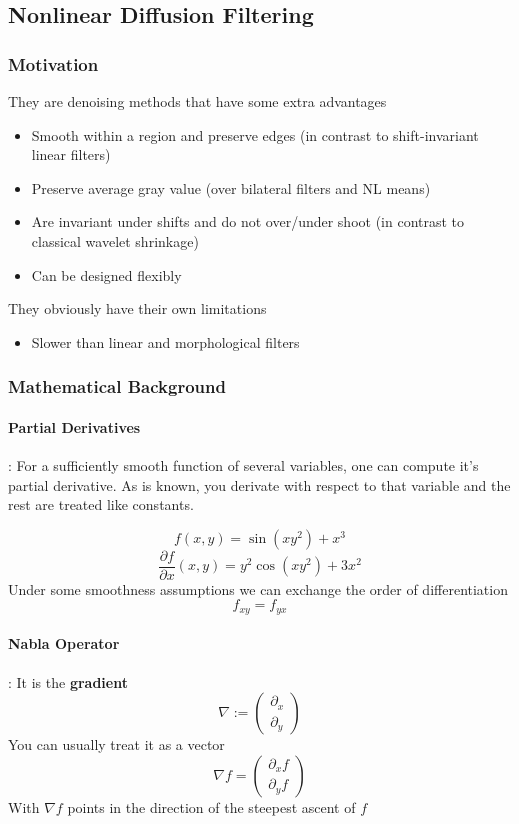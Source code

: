 \documentclass{article}
\begin{document}
\subsection{Nonlinear Diffusion Filtering}
\subsubsection{Motivation}
They are denoising methods that have some extra advantages
\begin{itemize}
  \item Smooth within a region and preserve edges (in contrast to shift-invariant linear filters)
  \item Preserve average gray value (over bilateral filters and NL means)
  \item Are invariant under shifts and do not over/under shoot (in contrast to classical wavelet shrinkage)
  \item Can be designed flexibly
\end{itemize}

They obviously have their own limitations
\begin{itemize}
  \item Slower than linear and morphological filters
\end{itemize}

\subsubsection{Mathematical Background}
\paragraph{Partial Derivatives}: For a sufficiently smooth function of several variables, one can compute it's partial derivative. As is known, you derivate with respect to that variable and the rest are treated like constants.

\[f(x,y) = \sin(xy^2) + x^3\]
\[\frac{\partial f}{\partial x}(x,y) = y^2 \cos(xy^2) + 3x^2\]
Under some smoothness assumptions we can exchange the order of differentiation
\[f_{xy} = f_{yx}\]
\paragraph{Nabla Operator}: It is the \textbf{gradient}
\[\nabla := \begin{pmatrix}
  \partial_x \\
  \partial_y
\end{pmatrix}\]
You can usually treat it as a vector
\[\nabla f = \begin{pmatrix}
  \partial_x f \\
  \partial_y f
\end{pmatrix}\]
With $\nabla f $ points in the direction of the steepest ascent of $f$
\end{document}

